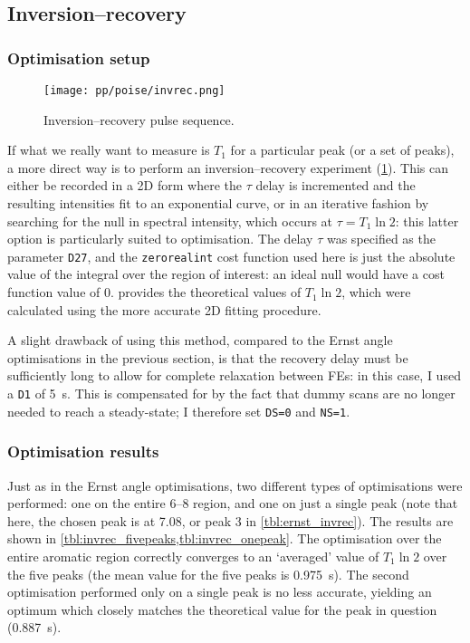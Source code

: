 \subsection{Inversion--recovery}
\label{subsec:poise__invrec}


\subsubsection{Optimisation setup}

\begin{figure}[htb]
    \centering
    \texttt{[image: pp/poise/invrec.png]}%
    \caption[Inversion--recovery pulse sequence]{Inversion--recovery pulse sequence.}
    \label{fig:poise_invrec}
\end{figure}

If what we really want to measure is $T_1$ for a particular peak (or a set of peaks), a more direct way is to perform an inversion--recovery experiment (\cref{fig:poise_invrec}).
This can either be recorded in a 2D form where the $\tau$ delay is incremented and the resulting intensities fit to an exponential curve, or in an iterative fashion by searching for the null in spectral intensity, which occurs at $\tau = T_1\ln 2$: this latter option is particularly suited to optimisation.
The delay $\tau$ was specified as the parameter \texttt{D27}, and the \texttt{zerorealint} cost function used here is just the absolute value of the integral over the region of interest: an ideal null would have a cost function value of 0.
 provides the theoretical values of $T_1 \ln 2$, which were calculated using the more accurate 2D fitting procedure.

A slight drawback of using this method, compared to the Ernst angle optimisations in the previous section, is that the recovery delay must be sufficiently long to allow for complete relaxation between FEs: in this case, I used a \texttt{D1} of \qty{5}{\s}.
This is compensated for by the fact that dummy scans are no longer needed to reach a steady-state; I therefore set \texttt{DS=0} and \texttt{NS=1}.


\subsubsection{Optimisation results}

Just as in the Ernst angle optimisations, two different types of optimisations were performed: one on the entire \qtyrange{6}{8}{\ppm} region, and one on just a single peak (note that here, the chosen peak is at \qty{7.08}{\ppm}, or peak 3 in \cref{tbl:ernst_invrec}).
The results are shown in \cref{tbl:invrec_fivepeaks,tbl:invrec_onepeak}.
The optimisation over the entire aromatic region correctly converges to an `averaged' value of $T_1\ln 2$ over the five peaks (the mean value for the five peaks is \qty{0.975}{\s}).
The second optimisation performed only on a single peak is no less accurate, yielding an optimum which closely matches the theoretical value for the peak in question (\qty{0.887}{\s}).

